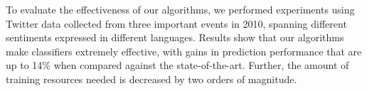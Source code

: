 
To evaluate the effectiveness of our algorithms, we
performed experiments using Twitter data collected from three important events in 2010, spanning different sentiments expressed in different languages.
Results show that our algorithms make classifiers extremely effective, with gains in prediction performance that are up to 14\% when compared against the state-of-the-art. Further, the amount of training resources needed is decreased by two orders of magnitude.
